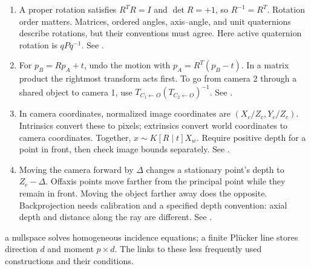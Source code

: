 \documentclass[letterpaper,11pt,english,openany,oneside]{jupyterBook}
\begin{document}
\begin{enumerate}
\item {}
\sphinxAtStartPar
{} A proper rotation satisfies \(R^TR=I\) and \(\det R=+1\), so \(R^{-1}=R^T\). Rotation order matters. Matrices, ordered angles, axis–angle, and unit quaternions describe rotations, but their conventions must agree. Here active quaternion rotation is \(qPq^{-1}\). See {\hyperref[\detokenize{lectures/lecture01/rotations:lec01-rotations}]{}}.

\item {}
\sphinxAtStartPar
{} For \(p_B=Rp_A+t\), undo the motion with \(p_A=R^T(p_B-t)\). In a matrix product the rightmost transform acts first. To go from camera 2 through a shared object to camera 1, use \(T_{C_1\leftarrow O}(T_{C_2\leftarrow O})^{-1}\). See {\hyperref[\detokenize{lectures/lecture01/frames-quizzes:lec01-frames}]{}}.

\item {}
\sphinxAtStartPar
{} In camera coordinates, normalized image coordinates are \((X_c/Z_c,Y_c/Z_c)\). Intrinsics convert these to pixels; extrinsics convert world coordinates to camera coordinates. Together, \(x\sim K[R\mid t]X_w\). Require positive depth for a point in front, then check image bounds separately. See {\hyperref[\detokenize{lectures/lecture01/cameras:lec01-cameras}]{}}.

\item {}
\sphinxAtStartPar
{} Moving the camera forward by \(\Delta\) changes a stationary point’s depth to \(Z_c-\Delta\). Off\sphinxhyphen{}axis points move farther from the principal point while they remain in front. Moving the object farther away does the opposite. Backprojection needs calibration and a specified depth convention: axial depth and distance along the ray are different. See {\hyperref[\detokenize{lectures/lecture01/cameras:ex-lec01-camera-motion}]{}}.

\end{enumerate}

\sphinxAtStartPar
{} a nullspace solves homogeneous incidence equations; a finite Plücker line stores direction \(d\) and moment \(p\times d\). The {\hyperref[\detokenize{lectures/lecture01/review::doc}]{}} links to these less frequently used constructions and their conditions.
\end{document}
